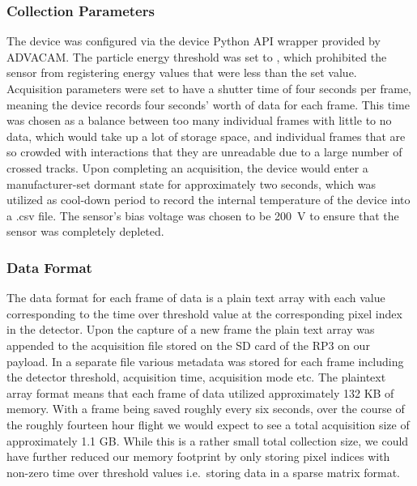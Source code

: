 {	\subsubsection{Collection Parameters}
  	The device was configured via the device Python API wrapper provided by ADVACAM. The particle energy threshold was set to \MPThreshold, which prohibited the sensor from registering energy values that were less than the set value. Acquisition parameters were set to have a shutter time of four seconds per frame, meaning the device records four seconds' worth of data for each frame. This time was chosen as a balance between too many individual frames with little to no data, which would take up a lot of storage space, and individual frames that are so crowded with interactions that they are unreadable due to a large number of crossed tracks. Upon completing an acquisition, the device would enter a manufacturer-set dormant state for approximately two seconds, which was utilized as cool-down period to record the internal temperature of the device into a .csv file. The sensor's bias voltage was chosen to be \SI{200}{\volt} to ensure that the sensor was completely depleted. 

\subsubsection{Data Format}
The data format for each frame of data is a plain text array with each value corresponding to the time over threshold value at the corresponding pixel index in the detector. Upon the capture of a new frame the plain text array was appended to the acquisition file stored on the SD card of the RP3 on our payload. In a separate file various metadata was stored for each frame including the detector threshold, acquisition time, acquisition mode etc. The plaintext array format means that each frame of data utilized approximately 132 KB of memory. With a frame being saved roughly every six seconds, over the course of the roughly fourteen hour flight we would expect to see a total acquisition size of approximately 1.1 GB. While this is a rather small total collection size, we could have further reduced our memory footprint by only storing pixel indices with non-zero time over threshold values i.e.\ storing data in a sparse matrix format. 

}
